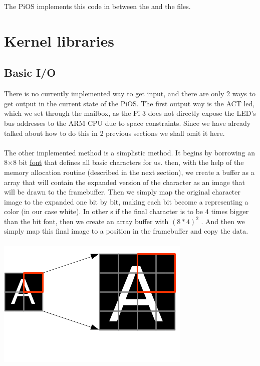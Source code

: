 \documentclass[12pt, svgnames]{book}
\begin{document}
The PiOS implements this code in between the \href{https://github.com/Makogan/PiOS/blob/master/source/Core/kernel_main.cpp}{} and the \href{https://github.com/Makogan/PiOS/blob/master/source/boot/interrupts.c}{} files.

\chapter{Kernel libraries}
\section{Basic I/O}
There is no currently implemented way to get input, and there are only 2 ways to get output in the current state of the PiOS. The first output way is the ACT led, which we set through the mailbox, as the Pi 3 does not directly expose the LED's bus addresses to the ARM CPU due to space constraints. Since we have already talked about how to do this in 2 previous sections we shall omit it here.
\\~\\
The other implemented method is a simplistic  method. It begins by borrowing an 8$\times$8 bit \href{https://github.com/Makogan/PiOS/blob/master/source/Fonts/basic_font.c}{font} that defines all basic  characters for us. then, with the help of the memory allocation routine (described in the next section), we create a buffer as a  array that will contain the expanded version of the character as an image that will be drawn to the framebuffer. Then we simply map the original character image to the expanded one bit by bit, making each bit become a  representing a color (in our case white). In other s if the final character is to be 4 times bigger than the bit font, then we create an array buffer with $(8*4)^2$ . And then we simply map this final image to a position in the framebuffer and copy the data.
\\~\\
\centering
\includegraphics[scale=1]{PrintMapping.png}
\flushleft
\end{document}
